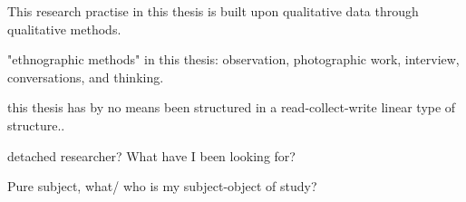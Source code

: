 This research practise in this thesis is built upon qualitative data through qualitative methods. 

"ethnographic methods" in this thesis: observation, photographic work, interview, conversations, and thinking. 

this thesis has by no means been structured in a read-collect-write linear type of structure.. 

detached researcher? 
What have I been looking for?

Pure subject, what/ who is my subject-object of study?